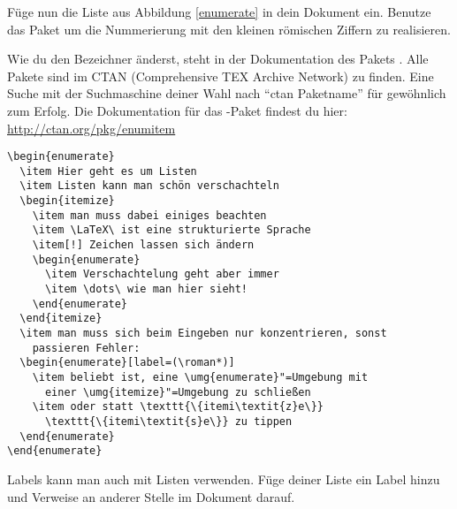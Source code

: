 \begin{uebung}
\item Füge nun die Liste aus Abbildung \ref{enumerate} in dein Dokument ein.
    Benutze das Paket  um die Nummerierung mit den kleinen
    römischen Ziffern zu realisieren.
    \begin{hinweis}
        Wie du den Bezeichner änderst, steht in der Dokumentation des Pakets
        . Alle Pakete sind im CTAN (Comprehensive TEX Archive Network)
        zu finden. Eine Suche mit der Suchmaschine deiner Wahl nach
        \enquote{ctan Paketname} für gewöhnlich zum Erfolg. Die Dokumentation für
        das -Paket findest du hier: \url{http://ctan.org/pkg/enumitem}
    \end{hinweis}
    \begin{loesung}
\begin{verbatim}
\begin{enumerate}
  \item Hier geht es um Listen
  \item Listen kann man schön verschachteln
  \begin{itemize}
    \item man muss dabei einiges beachten
    \item \LaTeX\ ist eine strukturierte Sprache
    \item[!] Zeichen lassen sich ändern
    \begin{enumerate} 
      \item Verschachtelung geht aber immer
      \item \dots\ wie man hier sieht!
    \end{enumerate}
  \end{itemize}
  \item man muss sich beim Eingeben nur konzentrieren, sonst 
    passieren Fehler:
  \begin{enumerate}[label=(\roman*)]
    \item beliebt ist, eine \umg{enumerate}"=Umgebung mit 
      einer \umg{itemize}"=Umgebung zu schließen
    \item oder statt \texttt{\{itemi\textit{z}e\}} 
      \texttt{\{itemi\textit{s}e\}} zu tippen
  \end{enumerate}
\end{enumerate}
\end{verbatim}
    \end{loesung}

\item Labels kann man auch mit Listen verwenden. Füge deiner Liste ein Label
    hinzu und Verweise an anderer Stelle im Dokument darauf.


\end{uebung}
